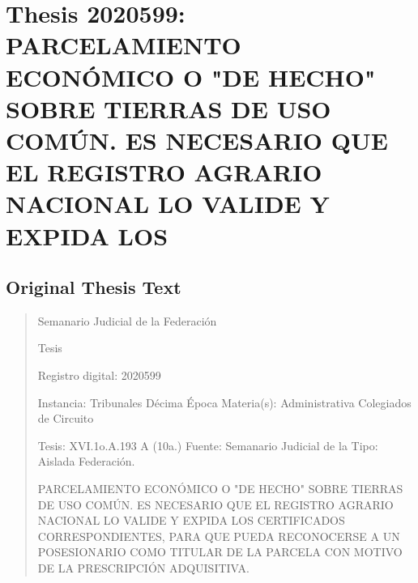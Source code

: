 \documentclass[11pt,a4paper]{article}
\begin{document}
\newpage

\section{Thesis 2020599: PARCELAMIENTO ECONÓMICO O "DE HECHO" SOBRE TIERRAS DE USO COMÚN. ES NECESARIO QUE EL REGISTRO AGRARIO NACIONAL LO VALIDE Y EXPIDA LOS}
\label{thesis:2020599}

\subsection{Original Thesis Text}

\begin{quote}
                                                   Semanario Judicial de la Federación

                                                Tesis

 Registro digital: 2020599

 Instancia: Tribunales             Décima Época                           Materia(s): Administrativa
 Colegiados de Circuito

 Tesis: XVI.1o.A.193 A (10a.)      Fuente: Semanario Judicial de la       Tipo: Aislada
                                   Federación.


PARCELAMIENTO ECONÓMICO O "DE HECHO" SOBRE TIERRAS DE USO COMÚN. ES
NECESARIO QUE EL REGISTRO AGRARIO NACIONAL LO VALIDE Y EXPIDA LOS
CERTIFICADOS CORRESPONDIENTES, PARA QUE PUEDA RECONOCERSE A UN
POSESIONARIO COMO TITULAR DE LA PARCELA CON MOTIVO DE LA PRESCRIPCIÓN
ADQUISITIVA.



\end{quote}
\end{document}
